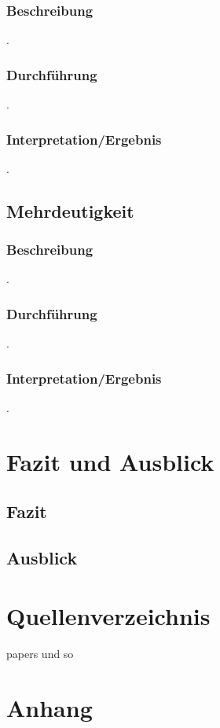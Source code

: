 \documentclass[12pt,a4paper]{report}
\begin{document}
		\subsection{Beschreibung}
		.
		\subsection{Durchführung}
		.
		\subsection{Interpretation/Ergebnis}
		.
	\newpage
	\section{Mehrdeutigkeit}
		\subsection{Beschreibung}
		.
		\subsection{Durchführung}
		.
		\subsection{Interpretation/Ergebnis}
		.
		

\newpage
\chapter{Fazit und Ausblick}
\section{Fazit}

\newpage
\section{Ausblick}
\newpage
\chapter*{Quellenverzeichnis}


\nocite{DBLP:journals/corr/abs-1301-3781}
\nocite{DBLP:journals/corr/MikolovSCCD13}
papers und so
\listoftables
\listoffigures 




\chapter{Anhang}
\end{document}
